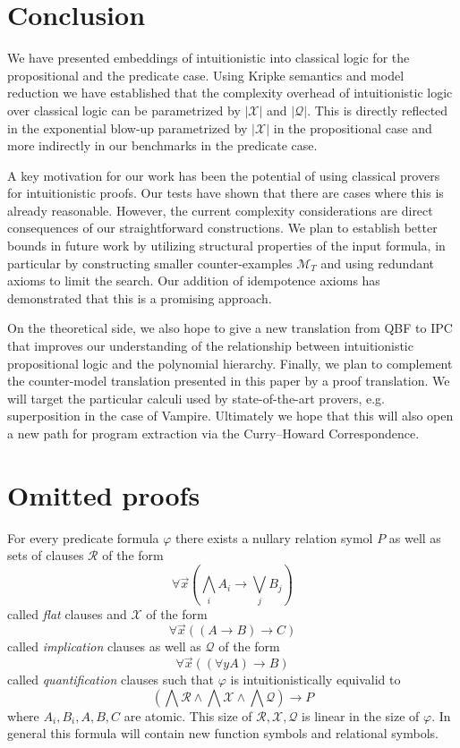 \documentclass[runningheads]{llncs}
\begin{document}
\section{Conclusion}

We have presented embeddings of intuitionistic into classical logic for the propositional and the predicate case. Using Kripke semantics and model reduction we have established that the complexity overhead of intuitionistic logic over classical logic can be parametrized by $|\mathcal X|$ and $|\mathcal Q|$. This is directly reflected in the exponential blow-up parametrized by $|\mathcal X|$ in the propositional case and more indirectly in our benchmarks in the predicate case.

A key motivation for our work has been the potential of using classical provers for intuitionistic proofs. Our tests have shown that there are cases where this is already reasonable.
However, the current complexity considerations are direct consequences of our straightforward constructions. We plan to establish better bounds in future work by utilizing structural properties of the input formula, in particular by constructing smaller counter-examples $\mathcal M_T$ and using redundant axioms to limit the search. Our addition of idempotence axioms has demonstrated that this is a promising approach.

On the theoretical side, we also hope to give a new translation from QBF to IPC that improves our understanding of the relationship between intuitionistic propositional logic and the polynomial hierarchy.
Finally, we plan to complement the counter-model translation presented in this paper by a proof translation.
We will target the particular calculi used by state-of-the-art provers, e.g. superposition in the case of Vampire. Ultimately we hope that this will also open a new path for program extraction via the Curry--Howard Correspondence.




\appendix

\section{Omitted proofs}

\begin{lemma}\label{proof:first-order-normal-form}
	For every predicate formula $\varphi$ there exists a nullary relation symol $P$ as well as sets of clauses $\mathcal R$ of the form
	$$\forall \vec x\left(\bigwedge_i A_i\to \bigvee_j B_j\right)$$
	called \emph{flat} clauses and $\mathcal X$ of the form
	$$\forall \vec x\left((A\to B)\to C\right)$$
	called \emph{implication} clauses as well as $\mathcal Q$ of the form
	$$\forall\vec x\left((\forall y A)\to B\right)$$
	called \emph{quantification} clauses such that $\varphi$ is intuitionistically equivalid to
	$$\left(\bigwedge\mathcal R\wedge\bigwedge \mathcal X\wedge\bigwedge\mathcal Q\right)\to P$$where $A_i, B_i, A, B, C$ are atomic. This size of $\mathcal R, \mathcal X, \mathcal Q$ is linear in the size of $\varphi$. In general this formula will contain new function symbols and relational symbols.
\end{lemma}
\end{document}
